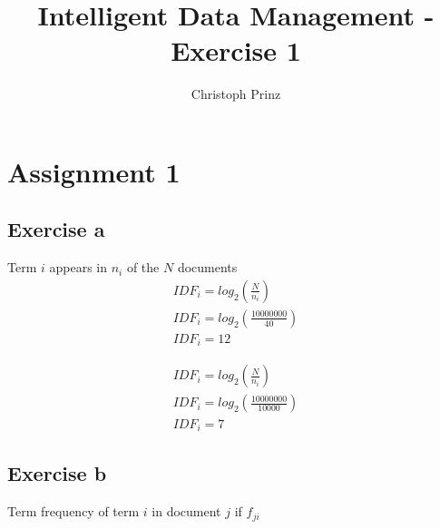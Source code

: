\documentclass[]{scrartcl}
\title{Intelligent Data Management - Exercise 1}
\author{Christoph Prinz}
\begin{document}
\maketitle


\section{Assignment 1}

\subsection{Exercise a}

Term $i$ appears in $n_i$ of the $N$ documents \\

\begin{equation}
\begin{split}
IDF_i = log_2(\frac{N}{n_i})\\
IDF_i = log_2(\frac{10000000}{40})\\
IDF_i = 12
\end{split}
\end{equation}

\begin{equation}
\begin{split}
IDF_i = log_2(\frac{N}{n_i})\\
IDF_i = log_2(\frac{10000000}{10000})\\
IDF_i = 7
\end{split}
\end{equation}

\subsection{Exercise b}

Term frequency of term $i$ in document $j$ if $f_{ji}$
\end{document}
